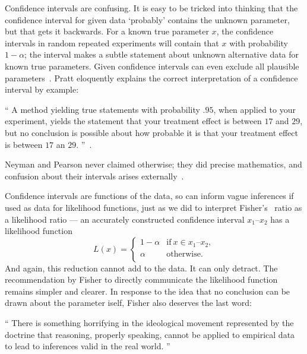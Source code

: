 Confidence intervals are confusing.
It is easy to be tricked into thinking that the confidence interval for given
data `probably' contains the unknown parameter, but that gets it backwards.
For a known true parameter $x$, the confidence intervals in random repeated
experiments will contain that $x$ with probability $1 - \alpha$;
the interval makes a subtle statement about unknown alternative data for
known true parameters.
Given confidence intervals can even exclude all plausible parameters~\cite{
pratt1961testing,
Jaynes1976intervals
}.
Pratt eloquently explains the correct interpretation of a confidence interval
by example:
\begin{displayquote}
\small
``%
A method yielding true statements with probability $.95$, when applied to your
experiment, yields the statement that your treatment effect is between $17$ and
$29$, but no conclusion is possible about how probable it is that your
treatment effect is between $17$ an $29$.%
''~\cite{pratt1961testing}.
\end{displayquote}
Neyman and Pearson never claimed otherwise; they did precise mathematics, and
confusion about their intervals arises externally~\cite{jaynes2003probability}.

Confidence intervals are functions of the data, so can inform vague inferences
if used as data for likelihood functions, just as we did to interpret Fisher's
\pvalue\ ratio as a likelihood ratio ---
an accurately constructed confidence interval $x_1\textrm{--}x_2$ has a
likelihood function
\begin{equation}
L(x) =
\left\{
\begin{matrix}
1 - \alpha & \textrm{if}~x \in x_1\textrm{--}x_2, \\
\alpha & \textrm{otherwise.} \\
\end{matrix}
\right.
\end{equation}
And again, this reduction cannot add to the data.
It can only detract.
The recommendation by Fisher to directly communicate the likelihood function
remains simpler and clearer.
In response to the idea that no conclusion can be drawn about the parameter
iself, Fisher also deserves the last word:
\begin{displayquote}
\small
``%
There is something horrifying in the ideological movement represented by the
doctrine that reasoning, properly speaking, cannot be applied to empirical data
to lead to inferences valid in the real world.%
''~\cite{fisher1956statistical}
\end{displayquote}


